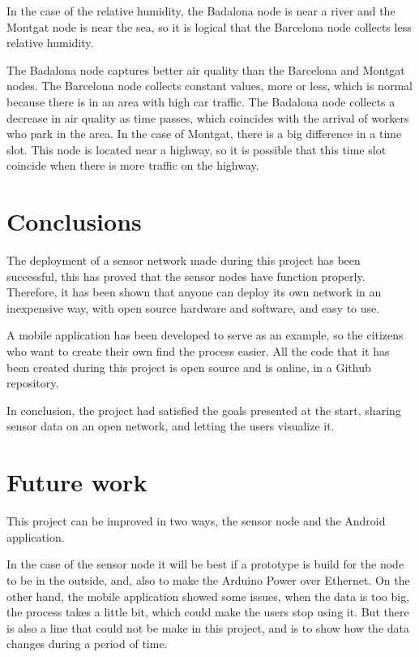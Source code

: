 \documentclass[12pt, a4paper,twoside]{tesi_upf}
\begin{document}
      In the case of the relative humidity, the Badalona node is near a river and the Montgat node is near the sea, so it is logical that the Barcelona node collects less relative humidity.
      
      The Badalona node captures better air quality than the Barcelona and Montgat nodes. The Barcelona node collects constant values, more or less, which is normal because there is in an area with high car traffic. The Badalona node collects a decrease in air quality as time passes, which coincides with the arrival of workers who park in the area. In the case of Montgat, there is a big difference in a time slot. This node is located near a highway, so it is possible that this time slot coincide when there is more traffic on the highway.

\chapter{Conclusions}
\label{Chapter6}
  
  The deployment of a sensor network made during this project has been successful, this has proved that the sensor nodes have function properly.  
  Therefore, it has been shown that anyone can deploy its own network in an inexpensive way, with open source hardware and software, and easy to use.
  
  A mobile application has been developed to serve as an example, so the citizens who want to create their own find the process easier.
 	All the code that it has been created during this project is open source and is online, in a Github repository.
  
  In conclusion, the project had satisfied the goals presented at the start, sharing sensor data on an open network, and letting the users visualize it.

\chapter{Future work}
\label{Chapter7}
  
  This project can be improved in two ways, the sensor node and the Android application.
  
  In the case of the sensor node it will be best if a prototype is build for the node to be in the outside, and, also to make the Arduino Power over Ethernet.
  On the other hand, the mobile application showed some issues, when the data is too big, the process takes a little bit, which could make the users stop using it. But there is also a line that could not be make in this project, and is to show how the data changes during a period of time.
  
\end{document}
